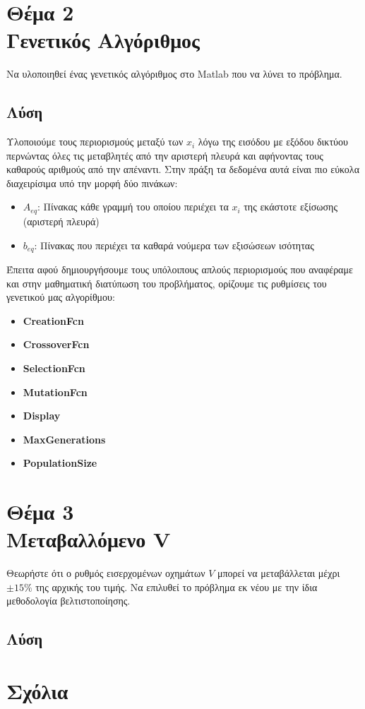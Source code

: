 \documentclass[twocolumn]{report}
\begin{document}
\section*{Θέμα 2\\Γενετικός Αλγόριθμος}
Να υλοποιηθεί ένας γενετικός αλγόριθμος στο 
Matlab που να λύνει το πρόβλημα.
\subsection*{Λύση}
Υλοποιούμε τους περιορισμούς μεταξύ των $x_i$ λόγω της εισόδου με εξόδου δικτύου 
περνώντας όλες τις μεταβλητές από την αριστερή πλευρά και αφήνοντας τους καθαρούς
αριθμούς από την απέναντι. Στην πράξη τα δεδομένα αυτά είναι πιο εύκολα διαχειρίσιμα 
υπό την μορφή δύο πινάκων:
\begin{itemize}
    \item $A_{eq}$: Πίνακας κάθε γραμμή του οποίου περιέχει τα $x_i$ της εκάστοτε 
    εξίσωσης (αριστερή πλευρά)
    \item $b_{eq}$: Πίνακας που περιέχει τα καθαρά νούμερα των εξισώσεων ισότητας
\end{itemize}
Έπειτα αφού δημιουργήσουμε τους υπόλοιπους απλούς περιορισμούς που αναφέραμε και στην 
μαθηματική διατύπωση του προβλήματος, ορίζουμε τις ρυθμίσεις του γενετικού μας αλγορίθμου:
\begin{itemize}
    \item {}\textbf{CreationFcn}
    \item {}\textbf{CrossoverFcn}
    \item {}\textbf{SelectionFcn}
    \item {}\textbf{MutationFcn}
    \item {}\textbf{Display}
    \item {}\textbf{MaxGenerations}
    \item {}\textbf{PopulationSize}
\end{itemize}

\section*{Θέμα 3\\Μεταβαλλόμενο V}
Θεωρήστε ότι ο ρυθμός εισερχομένων οχημάτων $V$ μπορεί να μεταβάλλεται μέχρι 
$\pm 15\%$ της αρχικής του τιμής. Να επιλυθεί το πρόβλημα εκ νέου με 
την ίδια μεθοδολογία βελτιστοποίησης. 
\subsection*{Λύση}

\section*{Σχόλια}

\end{document}

